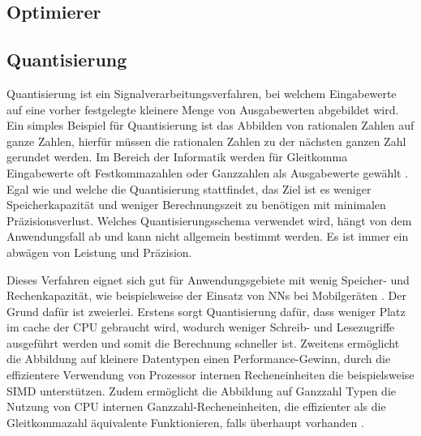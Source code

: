 \subsection{Optimierer}


\subsection{Quantisierung}

Quantisierung ist ein Signalverarbeitungsverfahren, bei welchem Eingabewerte auf eine vorher festgelegte kleinere Menge von Ausgabewerten abgebildet wird. Ein simples Beispiel für Quantisierung ist das Abbilden von rationalen Zahlen auf ganze Zahlen, hierfür müssen die rationalen Zahlen zu der nächsten ganzen Zahl gerundet werden. Im Bereich der Informatik werden für Gleitkomma Eingabewerte oft Festkommazahlen oder Ganzzahlen als Ausgabewerte gewählt \cite{Gysel2016}. Egal wie und welche die Quantisierung stattfindet, das Ziel ist es weniger Speicherkapazität und weniger Berechnungszeit zu benötigen mit minimalen Präzisionsverlust. Welches Quantisierungsschema verwendet wird, hängt von dem Anwendungsfall ab und kann nicht allgemein bestimmt werden. Es ist immer ein abwägen von Leistung und Präzision.

Dieses Verfahren eignet sich gut für Anwendungsgebiete mit wenig Speicher- und Rechenkapazität, wie beispielsweise der Einsatz von \acp{NN} bei Mobilgeräten \cite{MaQuantization2019, Gysel2016}. Der Grund dafür ist zweierlei. Erstens sorgt Quantisierung dafür, dass weniger Platz im cache der CPU gebraucht wird, wodurch weniger Schreib- und Lesezugriffe ausgeführt werden und somit die Berechnung schneller ist. Zweitens ermöglicht die Abbildung auf kleinere Datentypen einen Performance-Gewinn, durch die effizientere Verwendung von Prozessor internen Recheneinheiten die beispielsweise \ac{SIMD} unterstützen. Zudem ermöglicht die Abbildung auf Ganzzahl Typen die Nutzung von CPU internen Ganzzahl-Recheneinheiten, die effizienter als die Gleitkommazahl äquivalente Funktionieren, falls überhaupt vorhanden \cite{Jacob2017}.

